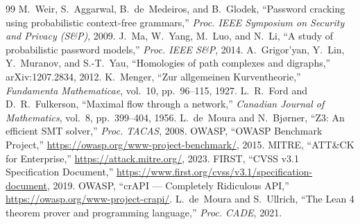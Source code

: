 \documentclass[journal]{IEEEtran}
\begin{document}
\begin{thebibliography}{99}
 M.~Weir, S.~Aggarwal, B.~de~Medeiros, and B.~Glodek,
``Password cracking using probabilistic context-free grammars,''
\emph{Proc. IEEE Symposium on Security and Privacy (S\&P)}, 2009.
 J.~Ma, W.~Yang, M.~Luo, and N.~Li,
``A study of probabilistic password models,''
\emph{Proc. IEEE S\&P}, 2014.
 A.~Grigor'yan, Y.~Lin, Y.~Muranov, and S.-T.~Yau,
``Homologies of path complexes and digraphs,''
arXiv:1207.2834, 2012.
 K.~Menger, ``Zur allgemeinen Kurventheorie,''
\emph{Fundamenta Mathematicae}, vol.~10, pp.~96--115, 1927.
 L.~R.~Ford and D.~R.~Fulkerson,
``Maximal flow through a network,''
\emph{Canadian Journal of Mathematics}, vol.~8, pp.~399--404, 1956.
 L.~de~Moura and N.~Bj{\o}rner,
``Z3: An efficient SMT solver,''
\emph{Proc. TACAS}, 2008.
 OWASP, ``OWASP Benchmark Project,''
\url{https://owasp.org/www-project-benchmark/}, 2015.
 MITRE, ``ATT\&CK for Enterprise,''
\url{https://attack.mitre.org/}, 2023.
 FIRST, ``CVSS v3.1 Specification Document,''
\url{https://www.first.org/cvss/v3.1/specification-document}, 2019.
 OWASP, ``crAPI --- Completely Ridiculous API,''
\url{https://owasp.org/www-project-crapi/}.
 L.~de~Moura and S.~Ullrich,
``The Lean 4 theorem prover and programming language,''
\emph{Proc. CADE}, 2021.
\end{thebibliography}
\end{document}

